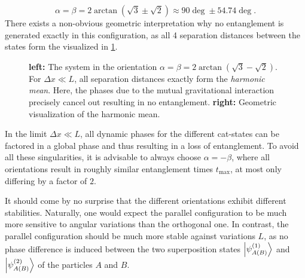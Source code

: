 \begin{equation}
  \alpha=\beta=2 \arctan(\sqrt{3}\pm\sqrt{2})\approx 90\deg \pm 54.74\deg .
\end{equation}
There exists a non-obvious geometric interpretation why no entanglement is generated exactly in this configuration, as all 4 separation distances between the states form the  visualized in \cref{fig:4:harmonic-mean}.
\begin{figure}[!htbp]
  \centering
  \def\svgwidth{\textwidth}
  
  \caption{\textbf{left:} The system in the orientation $\alpha=\beta=2\arctan(\sqrt{3}-\sqrt{2})$. For $\Delta x \ll L$, all separation distances exactly form the \textit{harmonic mean}. Here, the phases due to the mutual gravitational interaction precisely cancel out resulting in no entanglement. \textbf{right:} Geometric visualization of the harmonic mean.}
  \label{fig:4:harmonic-mean}
\end{figure}
In the limit $\Delta x \ll L$, all dynamic phases for the different cat-states can be factored in a global phase and thus resulting in a loss of entanglement. 
To avoid all these singularities, it is advisable to always choose $\alpha=-\beta$, where all orientations result in roughly similar entanglement times $t_\mathrm{max}$, at most only differing by a factor of $2$.

It should come by no surprise that the different orientations exhibit different stabilities. Naturally, one would expect the parallel configuration to be much more sensitive to angular variations than the orthogonal one.
In contrast, the parallel configuration should be much more stable against variations $L$, as no phase difference is induced between the two superposition states $\ket{\psi^{(1)}_{A(B)}}$ and $\ket{\psi^{(2)}_{A(B)}}$ of the particles $A$ and $B$.

